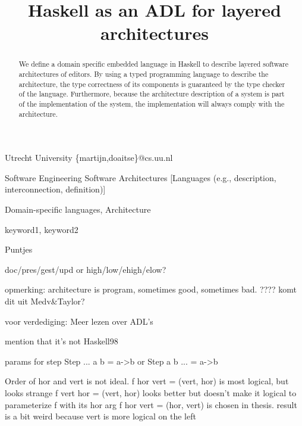 \documentclass[preprint,natbib]{sigplanconf}
\begin{document}
\copyrightdata{[to be supplied]} 

\preprintfooter{\version}   %

\title{Haskell as an ADL for layered architectures}

           {Utrecht University}
           {\{martijn,doaitse\}@cs.uu.nl}

\maketitle

\begin{abstract}
We define a domain specific embedded language in Haskell to describe
layered software architectures of editors. By using a typed programming
language to describe the architecture, the type correctness of its components
is guaranteed by the type checker of the language. Furthermore, because the
architecture description of a system is part of the implementation of the
system, the implementation will always comply with the architecture.
\end{abstract}

 {Software Engineering}
                  {Software Architectures}
                  [Languages (e.g., description, interconnection, definition)]

\terms
Domain-specific languages, Architecture

\keywords
keyword1, keyword2



\bc
Puntjes

doc/pres/gest/upd or high/low/ehigh/elow?

opmerking: architecture is program, sometimes good, sometimes bad. ???? komt dit uit Medv&Taylor?

voor verdediging: Meer lezen over ADL's


mention that it's not Haskell98

params for step Step ... a b = a->b or Step a b ... = a->b


Order of hor and vert is not ideal.  
f hor vert = (vert, hor) is most logical, but looks strange
f vert hor = (vert, hor) looks better but doesn't make it logical to parameterize f with its hor arg
f hor vert = (hor, vert) is chosen in thesis. result is a bit weird because vert is more logical on the left
\end{document}
